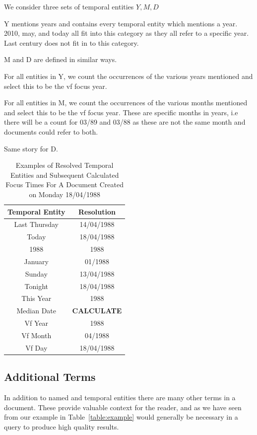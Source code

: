 \documentclass{mpaper}
\begin{document}
We consider three sets of temporal entities $Y, M, D$ 

Y mentions years and contains every temporal entity which mentions a year.
2010, may, and today all fit into this category as they all refer to a specific year. Last century does not fit in to this category.

M and D are defined in similar ways.

For all entities in Y, we count the occurrences of the various years mentioned and select this to be the vf focus year.

For all entities in M, we count the occurrences of the various months mentioned and select this to be the vf focus year. These are specific months in years, i.e there will be a count for 03/89 and 03/88 as these are not the same month and documents could refer to both.

Same story for D.



\begin{table}[t] 
\centering
\begin{tabular}{|c|c|}
\hline
Temporal Entity 	& Resolution 					\\ \hline
Last Thursday 		& 14/04/1988   \\ 
Today				& 18/04/1988 \\ 
1988 				& 1988  \\ 
January 			& 01/1988   \\ 
Sunday 				& 13/04/1988   \\ 
Tonight				& 18/04/1988 \\ 
This Year 			& 1988   \\ \hline \hline
Median Date			& \textbf{CALCULATE} \\
Vf Year				& 1988	\\
Vf Month			& 04/1988	\\	
Vf Day				& 18/04/1988	\\ \hline
\end{tabular}
\caption{Examples of Resolved Temporal Entities and Subsequent Calculated Focus Times For A Document Created on Monday 18/04/1988}
\label{table:focustimes}
\end{table}

 
\subsection{Additional Terms}
In addition to named and temporal entities there are many other terms in a document. These provide valuable context for the reader, and as we have seen from our example in Table~\ref{table:example} would generally be necessary in a query to produce high quality results.
\end{document}
